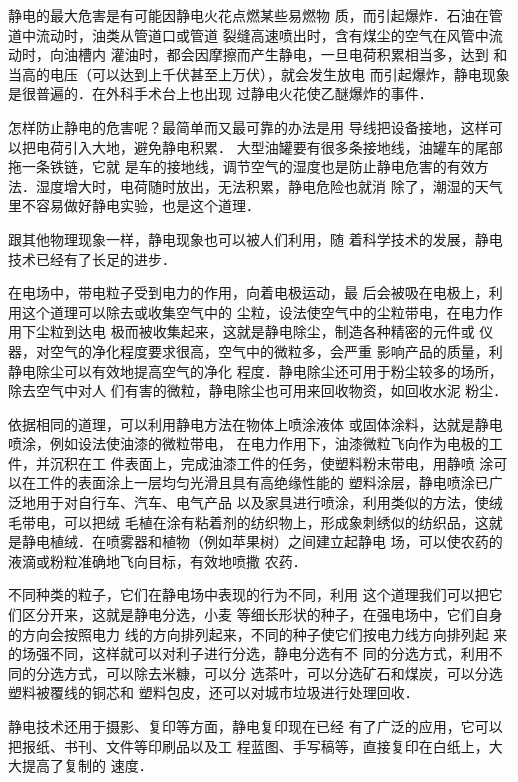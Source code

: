 静电的最大危害是有可能因静电火花点燃某些易燃物
质，而引起爆炸．石油在管道中流动时，油类从管道口或管道
裂缝高速喷出时，含有煤尘的空气在风管中流动时，向油槽内
灌油时，都会因摩擦而产生静电，一旦电荷积累相当多，达到
和当高的电压（可以达到上千伏甚至上万伏），就会发生放电
而引起爆炸，静电现象是很普遍的．在外科手术台上也出现
过静电火花使乙醚爆炸的事件．

怎样防止静电的危害呢？最简单而又最可靠的办法是用
导线把设备接地，这样可以把电荷引入大地，避免静电积累．
大型油罐要有很多条接地线，油罐车的尾部拖一条铁链，它就
是车的接地线，调节空气的湿度也是防止静电危害的有效方
法．湿度增大时，电荷随时放出，无法积累，静电危险也就消
除了，潮湿的天气里不容易做好静电实验，也是这个道理．

跟其他物理现象一样，静电现象也可以被人们利用，随
着科学技术的发展，静电技术已经有了长足的进步．

在电场中，带电粒子受到电力的作用，向着电极运动，最
后会被吸在电极上，利用这个道理可以除去或收集空气中的
尘粒，设法使空气中的尘粒带电，在电力作用下尘粒到达电
极而被收集起来，这就是静电除尘，制造各种精密的元件或
仪器，对空气的净化程度要求很高，空气中的微粒多，会严重
影响产品的质量，利静电除尘可以有效地提高空气的净化
程度．静电除尘还可用于粉尘较多的场所，除去空气中对人
们有害的微粒，静电除尘也可用来回收物资，如回收水泥
粉尘．

依据相同的道理，可以利用静电方法在物体上喷涂液体
或固体涂料，达就是静电喷涂，例如设法使油漆的微粒带电，
在电力作用下，油漆微粒飞向作为电极的工件，并沉积在工
件表面上，完成油漆工件的任务，使塑料粉末带电，用静喷
涂可以在工件的表面涂上一层均匀光滑且具有高绝缘性能的
塑料涂层，静电喷涂已广泛地用于对自行车、汽车、电气产品
以及家具进行喷涂，利用类似的方法，使绒毛带电，可以把绒
毛植在涂有粘着剂的纺织物上，形成象刺绣似的纺织品，这就
是静电植绒．在喷雾器和植物（例如苹果树）之间建立起静电
场，可以使农药的液滴或粉粒准确地飞向目标，有效地喷撒
农药．

不同种类的粒子，它们在静电场中表现的行为不同，利用
这个道理我们可以把它们区分开来，这就是静电分选，小麦
等细长形状的种子，在强电场中，它们自身的方向会按照电力
线的方向排列起来，不同的种子使它们按电力线方向排列起
来的场强不同，这样就可以对利子进行分选，静电分选有不
同的分选方式，利用不同的分选方式，可以除去米糠，可以分
选茶叶，可以分选矿石和煤炭，可以分选塑料被覆线的铜芯和
塑料包皮，还可以对城市垃圾进行处理回收．

静电技术还用于摄影、复印等方面，静电复印现在已经
有了广泛的应用，它可以把报纸、书刊、文件等印刷品以及工
程蓝图、手写稿等，直接复印在白纸上，大大提高了复制的
速度．

